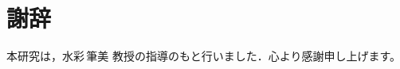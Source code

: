 \documentclass[../main]{subfiles}
\begin{document}
\section*{謝辞}

本研究は，水彩\,筆美\,\,教授の指導のもと行いました．心より感謝申し上げます。
\end{document}
